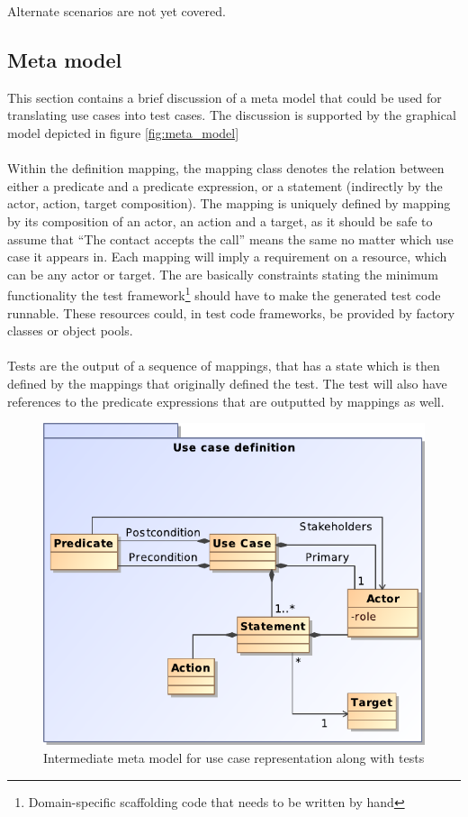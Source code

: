 Alternate scenarios are not yet covered.

\subsection{Meta model}
This section contains a brief discussion of a meta model that could be used for translating use cases into test cases. The discussion is supported by the graphical model depicted in figure \ref{fig:meta_model}\\\\
Within the definition mapping, the mapping class denotes the relation between either a predicate and a predicate expression, or a statement (indirectly by the actor, action, target composition). The mapping is uniquely defined by mapping by its composition of an actor, an action and a target, as it should be safe to assume that ``The contact accepts the call'' means the same no matter which use case it appears in. Each mapping will imply a requirement on a resource, which can be any actor or target. The are basically constraints stating the minimum functionality the test framework\footnote{Domain-specific scaffolding code that needs to be written by hand} should have to make the generated test code runnable. These resources could, in test code frameworks, be provided by factory classes or object pools.\\\\
Tests are the output of a sequence of mappings, that has a state which is then defined by the mappings that originally defined the test. The test will also have references to the predicate expressions that are outputted by mappings as well.

\begin{figure}[h]
  \centering
 
  \includegraphics[scale=0.72]{img/use_case_meta_model}
  \caption{Intermediate meta model for use case representation along with tests}
  \label{fig:use_case_meta_model}
\end{figure}


